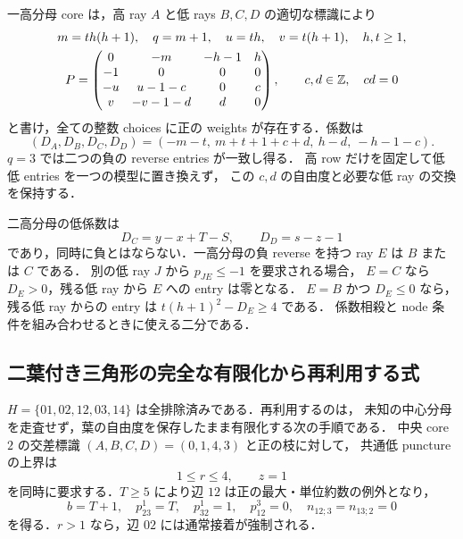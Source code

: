一高分母 core は，高 ray $A$ と低 rays $B,C,D$ の適切な標識により
\[
\begin{gathered}
 m=th(h+1),\quad q=m+1,\quad u=th,\quad v=t(h+1),
 \quad h,t\geq1,\\
 P=\begin{pmatrix}
 0&-m&-h-1&h\\
 -1&0&0&0\\
 -u&u-1-c&0&c\\
 v&-v-1-d&d&0
 \end{pmatrix},\qquad c,d\in\mathbb Z,\quad cd=0
\end{gathered}
\]
と書け，全ての整数 choices に正の weights が存在する．係数は
\[
 (D_A,D_B,D_C,D_D)=(-m-t,\ m+t+1+c+d,\ h-d,\ -h-1-c).
\]
$q=3$ では二つの負の reverse entries が一致し得る．
高 row だけを固定して低低 entries を一つの模型に置き換えず，
この $c,d$ の自由度と必要な低 ray の交換を保持する．

二高分母の低係数は
\[
 D_C=y-x+T-S,\qquad D_D=s-z-1
\]
であり，同時に負とはならない．一高分母の負 reverse を持つ ray $E$ は $B$ または $C$ である．
別の低 ray $J$ から $p_{JE}\leq-1$ を要求される場合，
$E=C$ なら $D_E>0$，残る低 ray から $E$ への entry は零となる．
$E=B$ かつ $D_E\leq0$ なら，残る低 ray からの entry は
$t(h+1)^2-D_E\geq4$ である．
係数相殺と node 条件を組み合わせるときに使える二分である．

\subsection{二葉付き三角形の完全な有限化から再利用する式}
\label{ng16:two-leaf-certificate}

$H=\{01,02,12,03,14\}$ は全排除済みである．再利用するのは，
未知の中心分母を走査せず，葉の自由度を保存したまま有限化する次の手順である．
中央 core $2$ の交差標識 $(A,B,C,D)=(0,1,4,3)$ と正の枝に対して，
共通低 puncture の上界は
\[
 1\le r\le4,\qquad z=1
\]
を同時に要求する．$T\ge5$ により辺 $12$ は正の最大・単位約数の例外となり，
\[
 b=T+1,\quad p^1_{23}=T,\quad p^1_{32}=1,\quad
 p^3_{12}=0,\quad n_{12;3}=n_{13;2}=0
\]
を得る．$r>1$ なら，辺 $02$ には通常接着が強制される．


